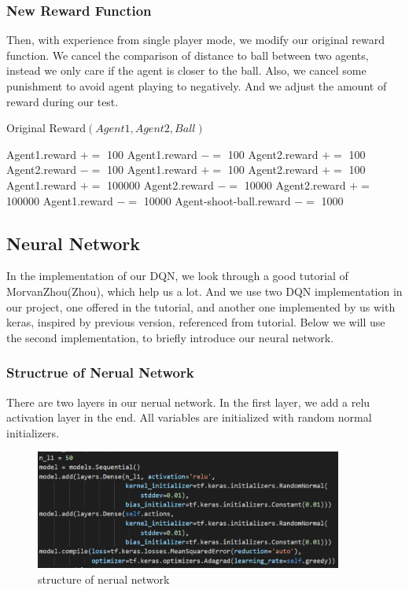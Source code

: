 \documentclass[12pt]{article}
\begin{document}
\subsubsection{New Reward Function}

Then, with experience from single player mode, we modify our original reward function. We cancel the comparison of distance to ball between two agents, instead we only care if the agent is closer to the ball. Also, we cancel some punishment to avoid agent playing to negatively. And we adjust the amount of reward during our test.
\begin{algorithm}[H]
	\caption{Original Reward$(Agent1,Agent2,Ball)$}
	\begin{algorithmic}
		\State Agent1.reward $+=$ 100
		\Else
		\State Agent1.reward $-=$ 100
		\EndIf
		\State Agent2.reward $+=$ 100
		\Else
		\State Agent2.reward $-=$ 100
		\EndIf
		\State Agent1.reward $+=$ 100
		\EndIf
		\State Agent2.reward $+=$ 100
		\EndIf
		\State Agent1.reward $+=$ 100000
		\State Agent2.reward $-=$ 10000
		\EndIf
		\State Agent2.reward $+=$ 100000
		\State Agent1.reward $-=$ 10000
		\EndIf
		\State Agent-shoot-ball.reward $-=$ 1000
		\EndIf
	\end{algorithmic}
\end{algorithm}

\subsection{Neural Network}
In the implementation of our DQN, we look through a good tutorial of MorvanZhou(Zhou), which help us a lot. And we use two DQN implementation in our project, one offered in the tutorial, and another one implemented by us with keras, inspired by previous version, referenced from tutorial. Below we will use the second implementation, to briefly introduce our neural network.

\subsubsection{Structrue of Nerual Network}
There are two layers in our nerual network. In the first layer, we add a relu activation layer in the end. All variables are initialized with random normal initializers.
\begin{figure}[H]
	\begin{center}
		\includegraphics[width=0.9\textwidth]{network}
		\caption{structure of nerual network}
	\end{center}
\end{figure}
\end{document}
